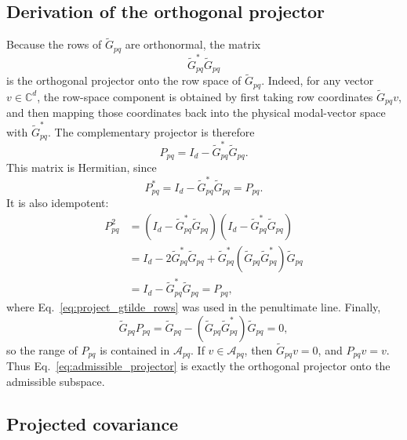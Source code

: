 \documentclass[11pt]{article}
\newcommand{\Gtilde}{\widetilde{G}}
\newcommand{\Pmat}{P}
\begin{document}
\subsection{Derivation of the orthogonal projector}

Because the rows of \(\Gtilde_{pq}\) are orthonormal, the matrix
\[
  \Gtilde_{pq}^*\Gtilde_{pq}
\]
is the orthogonal projector onto the row space of \(\Gtilde_{pq}\). Indeed,
for any vector \(v\in\mathbb{C}^d\), the row-space component is obtained by
first taking row coordinates \(\Gtilde_{pq}v\), and then mapping those
coordinates back into the physical modal-vector space with \(\Gtilde_{pq}^*\).
The complementary projector is therefore
\begin{equation}
  \Pmat_{pq}
  =
  I_d-\Gtilde_{pq}^*\Gtilde_{pq}.
  \label{eq:admissible_projector}
\end{equation}
This matrix is Hermitian, since
\[
  \Pmat_{pq}^*
  =
  I_d-\Gtilde_{pq}^*\Gtilde_{pq}
  =
  \Pmat_{pq}.
\]
It is also idempotent:
\begin{align}
  \Pmat_{pq}^2
  &=
  \left(I_d-\Gtilde_{pq}^*\Gtilde_{pq}\right)
  \left(I_d-\Gtilde_{pq}^*\Gtilde_{pq}\right) \nonumber\\
  &=
  I_d-2\Gtilde_{pq}^*\Gtilde_{pq}
  +\Gtilde_{pq}^*
   \left(\Gtilde_{pq}\Gtilde_{pq}^*\right)
   \Gtilde_{pq} \nonumber\\
  &=
  I_d-\Gtilde_{pq}^*\Gtilde_{pq}
  =
  \Pmat_{pq},
  \label{eq:projector_idempotent}
\end{align}
where Eq.~\eqref{eq:project_gtilde_rows} was used in the penultimate line.
Finally,
\[
  \Gtilde_{pq}\Pmat_{pq}
  =
  \Gtilde_{pq}
  -
  \left(\Gtilde_{pq}\Gtilde_{pq}^*\right)\Gtilde_{pq}
  =
  0,
\]
so the range of \(\Pmat_{pq}\) is contained in \(\mathcal{A}_{pq}\). If
\(v\in\mathcal{A}_{pq}\), then \(\Gtilde_{pq}v=0\), and
\(\Pmat_{pq}v=v\). Thus Eq.~\eqref{eq:admissible_projector} is exactly the
orthogonal projector onto the admissible subspace.

\subsection{Projected covariance}
\end{document}
